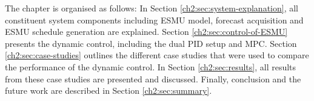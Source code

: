 The chapter is organised as follows:
In Section \ref{ch2:sec:system-explanation}, all constituent system components including ESMU model, forecast acquisition and ESMU schedule generation are explained.
Section \ref{ch2:sec:control-of-ESMU} presents the dynamic control, including the dual PID setup and MPC.
Section \ref{ch2:sec:case-studies} outlines the different case studies that were used to compare the performance of the dynamic control.
In Section \ref{ch2:sec:results}, all results from these case studies are presented and discussed.
Finally, conclusion and the future work are described in Section \ref{ch2:sec:summary}.










